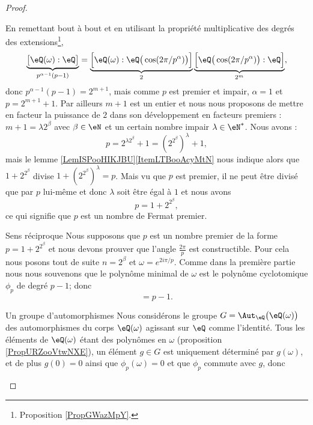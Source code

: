 \begin{proof}
\begin{subproof}
            En remettant bout à bout et en utilisant la propriété multiplicative des degrés des extensions\footnote{Proposition \ref{PropGWazMpY}.},
            \begin{equation}
                \underbrace{\big[ \eQ(\omega):\eQ \big]}_{p^{\alpha-1}(p-1)}=\underbrace{\Big[ \eQ(\omega):\eQ\big( \cos(2\pi/p^{\alpha}) \big) \Big]}_{2}\underbrace{\Big[ \eQ\big( \cos(2\pi/p^{\alpha}) \big):\eQ \Big]}_{2^m},
            \end{equation}
            donc \( p^{\alpha-1}(p-1)=2^{m+1}\), mais comme \( p\) est premier et impair, \( \alpha=1\) et \( p=2^{m+1}+1\). Par ailleurs \( m+1\) est un entier et nous nous proposons de mettre en facteur la puissance de \( 2\) dans son développement en facteurs premiers : \( m+1=\lambda 2^{\beta}\) avec \( \beta\in \eN\) et un certain nombre impair \( \lambda\in \eN^*\). Nous avons :
            \begin{equation}
                p=2^{\lambda 2^{\beta}}+1=\left( 2^{2^{\beta}} \right)^{\lambda}+1,
            \end{equation}
            mais le lemme \ref{LemISPooHIKJBU}\ref{ItemLTBooAcyMtN} nous indique alors que \( 1+2^{2^{\beta}}\) divise \( 1+\left( 2^{2^{\beta}} \right)^{\lambda}=p\). Mais vu que \( p\) est premier, il ne peut être divisé que par \( p\) lui-même et donc \( \lambda\) soit être égal à \( 1\) et nous avons
            \begin{equation}
                p=1+2^{2^{\beta}},
            \end{equation}
            ce qui signifie que \( p\) est un nombre de Fermat premier.
        \item[Sens réciproque]
            Nous supposons que \( p\) est un nombre premier de la forme \( p=1+2^{2^{\beta}}\) et nous devons prouver que l'angle \( \frac{ 2\pi }{ p }\) est constructible. Pour cela nous posons tout de suite \( n=2^{\beta}\) et \( \omega= e^{2i\pi/p}\). Comme dans la première partie nous nous souvenons que le polynôme minimal de \( \omega\) est le polynôme cyclotomique \( \phi_p\) de degré \( p-1\); donc
            \begin{equation}
                [\eQ(\omega):\eQ]=p-1.
            \end{equation}
            \begin{subproof}
                \item[Un groupe d'automorphismes]
                    Nous considérons le groupe \( G=\Aut_{\eQ}\big( \eQ(\omega) \big)\) des automorphismes du corps \( \eQ(\omega)\) agissant sur \( \eQ\) comme l'identité. Tous les éléments de \( \eQ(\omega)\) étant des polynômes en \( \omega\) (proposition \ref{PropURZooVtwNXE}), un élément \( g\in G\) est uniquement déterminé par \( g(\omega)\), et de plus \( g(0)=0\) ainsi que \( \phi_p(\omega)=0\) et que \( \phi_p\) commute avec \( g\), donc

\end{subproof}
\end{subproof}
\end{proof}

